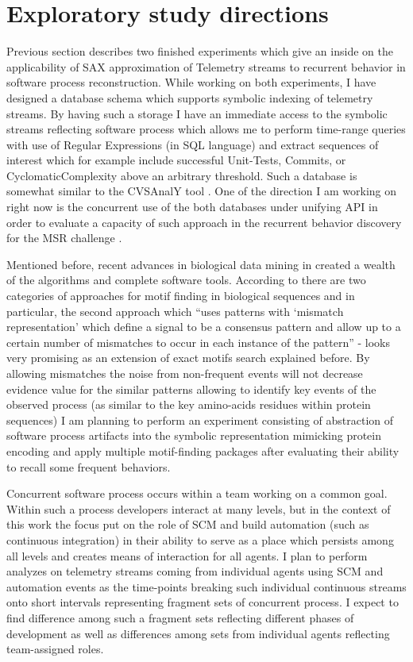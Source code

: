 \documentclass{sig-alternate}
\begin{document}
\section{Exploratory study directions}
Previous section describes two finished experiments which give an inside on the applicability of SAX approximation of Telemetry streams to recurrent behavior in software process reconstruction. While working on both experiments, I have designed a database schema which supports symbolic indexing of telemetry streams. By having such a storage I have an immediate access to the symbolic streams reflecting software process which allows me to perform time-range queries with use of Regular Expressions (in SQL language) and extract sequences of interest which for example include successful Unit-Tests, Commits, or CyclomaticComplexity above an arbitrary threshold. Such a database is somewhat similar to the CVSAnalY tool \cite{citeulike:6544724}. One of the direction I am working on right now is the concurrent use of the both databases under unifying API in order to evaluate a capacity of such approach in the recurrent behavior discovery for the MSR challenge \cite{citeulike:5043676}.

Mentioned before, recent advances in biological data mining in created a wealth of the algorithms and complete software tools. According to \cite{citeulike:964046} there are two categories of approaches for motif finding in biological sequences and in particular, the second approach which ``uses patterns with `mismatch representation' which define a signal to be a consensus pattern and allow up to a certain number of mismatches to occur in each instance of the pattern'' - looks very promising as an extension of exact motifs search explained before. By allowing mismatches the noise from non-frequent events will not decrease evidence value for the similar patterns allowing to identify key events of the observed process (as similar to the key amino-acids residues within protein sequences) I am planning to perform an experiment consisting of abstraction of software process artifacts into the symbolic representation mimicking protein encoding and apply multiple motif-finding packages after evaluating their ability to recall some frequent behaviors.

Concurrent software process occurs within a team working on a common goal. Within such a process developers interact at many levels, but in the context of this work the focus put on the role of SCM and build automation (such as continuous integration) in their ability to serve as a place which persists among all levels and creates means of interaction for all agents. I plan to perform analyzes on telemetry streams coming from individual agents using SCM and automation events as the time-points breaking such individual continuous streams onto short intervals representing fragment sets of concurrent process. I expect to find difference among such a fragment sets reflecting different phases of development as well as differences among sets from individual agents reflecting team-assigned roles.
\end{document}
